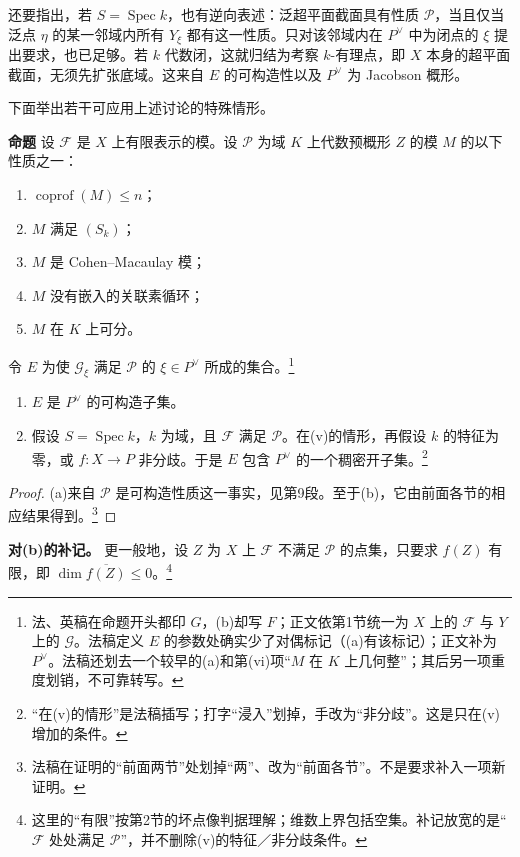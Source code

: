 \documentclass[openany,fontset=fandol]{ctexbook}
\DeclareMathOperator{\Spec}{Spec}
\DeclareMathOperator{\coprof}{coprof}
\newcommand{\FF}{\mathcal F}
\newcommand{\GG}{\mathcal G}
\newcommand{\calP}{\mathcal P}
\newcommand{\tagitem}[2]{\par\medskip\noindent\textbf{#1\quad #2}\enspace}
\begin{document}
还要指出，若 $S=\Spec k$，也有逆向表述：泛超平面截面具有性质 $\calP$，当且仅当泛点 $\eta$ 的某一邻域内所有 $Y_\xi$ 都有这一性质。只对该邻域内在 $P^\vee$ 中为闭点的 $\xi$ 提出要求，也已足够。若 $k$ 代数闭，这就归结为考察 $k$-有理点，即 $X$ 本身的超平面截面，无须先扩张底域。这来自 $E$ 的可构造性以及 $P^\vee$ 为 Jacobson 概形。

下面举出若干可应用上述讨论的特殊情形。

\tagitem{命题}{4.2}
设 $\FF$ 是 $X$ 上有限表示的模。设 $\calP$ 为域 $K$ 上代数预概形 $Z$ 的模 $M$ 的以下性质之一：
\begin{enumerate}[label=(\roman*),nosep]
\item $\coprof(M)\leq n$；
\item $M$ 满足 $(S_k)$；
\item $M$ 是 Cohen--Macaulay 模；
\item $M$ 没有嵌入的关联素循环；
\item $M$ 在 $K$ 上可分。
\end{enumerate}
令 $E$ 为使 $\GG_\xi$ 满足 $\calP$ 的 $\xi\in P^\vee$ 所成的集合。\footnote{法、英稿在命题开头都印 $G$，(b)却写 $F$；正文依第1节统一为 $X$ 上的 $\FF$ 与 $Y$ 上的 $\GG$。法稿定义 $E$ 的参数处确实少了对偶标记（(a)有该标记）；正文补为 $P^\vee$。法稿还划去一个较早的(a)和第(vi)项“$M$ 在 $K$ 上几何整”；其后另一项重度划销，不可靠转写。}
\begin{enumerate}[label=(\alph*),nosep]
\item $E$ 是 $P^\vee$ 的可构造子集。
\item 假设 $S=\Spec k$，$k$ 为域，且 $\FF$ 满足 $\calP$。在(v)的情形，再假设 $k$ 的特征为零，或 $f:X\to P$ 非分歧。于是 $E$ 包含 $P^\vee$ 的一个稠密开子集。\footnote{“在(v)的情形”是法稿插写；打字“浸入”划掉，手改为“非分歧”。这是只在(v)增加的条件。}
\end{enumerate}
\begin{proof}
(a)来自 $\calP$ 是可构造性质这一事实，见第9段。至于(b)，它由前面各节的相应结果得到。\footnote{法稿在证明的“前面两节”处划掉“两”、改为“前面各节”。不是要求补入一项新证明。}
\end{proof}
\noindent\textbf{对(b)的补记。}
更一般地，设 $Z$ 为 $X$ 上 $\FF$ 不满足 $\calP$ 的点集，只要求 $f(Z)$ 有限，即 $\dim\overline{f(Z)}\leq0$。\footnote{这里的“有限”按第2节的坏点像判据理解；维数上界包括空集。补记放宽的是“$\FF$ 处处满足 $\calP$”，并不删除(v)的特征／非分歧条件。}
\end{document}
